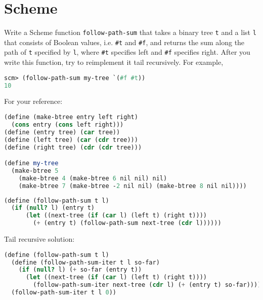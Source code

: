 \section{Scheme}
\begin{questions}
\question
Write a Scheme function \texttt{follow-path-sum} that takes a binary tree \texttt{t} and a list \texttt{l} that consists of Boolean values, i.e. \texttt{\#t} and \texttt{\#f}, and returns the sum along the path of \texttt{t} specified by \texttt{l}, where \texttt{\#t} specifies left and \texttt{\#f} specifies right. After you write this function, try to reimplement it tail recursively. For example,

\begin{center}
\end{center}

\begin{lstlisting}[language=Scheme]
scm> (follow-path-sum my-tree `(#f #t))
10
\end{lstlisting}

For your reference:
\begin{lstlisting}[language=Scheme]
(define (make-btree entry left right)
  (cons entry (cons left right)))
(define (entry tree) (car tree))
(define (left tree) (car (cdr tree)))
(define (right tree) (cdr (cdr tree)))

(define my-tree
  (make-btree 5
    (make-btree 4 (make-btree 6 nil nil) nil)
    (make-btree 7 (make-btree -2 nil nil) (make-btree 8 nil nil))))
\end{lstlisting}

\begin{solution}[1in]
\begin{lstlisting}[language=Scheme]
(define (follow-path-sum t l)
  (if (null? l) (entry t)
      (let ((next-tree (if (car l) (left t) (right t))))
        (+ (entry t) (follow-path-sum next-tree (cdr l))))))
\end{lstlisting}

Tail recursive solution:
\begin{lstlisting}[language=Scheme]
(define (follow-path-sum t l)
  (define (follow-path-sum-iter t l so-far)
    (if (null? l) (+ so-far (entry t))
      (let ((next-tree (if (car l) (left t) (right t))))
        (follow-path-sum-iter next-tree (cdr l) (+ (entry t) so-far)))))
  (follow-path-sum-iter t l 0))
\end{lstlisting}
\end{solution}
\end{questions}

